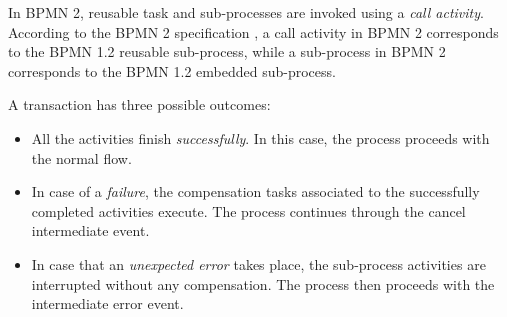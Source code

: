 In BPMN 2, reusable task and sub-processes are invoked using a \emph{call activity}. 
 According to the BPMN 2 specification \cite{BPMN20}, a call activity in BPMN 2 corresponds to the BPMN 1.2 reusable sub-process, while a sub-process in BPMN 2 corresponds to the BPMN 1.2 embedded sub-process.


A transaction has three possible outcomes:

 \begin{itemize}
\item  All the activities finish \emph{successfully}. In this case, the process proceeds with the normal flow. 
\item  In case of a \emph{failure}, the compensation tasks associated to the successfully completed activities execute. The process continues through the cancel intermediate event.
\item  In case that an \emph{unexpected error} takes place, the sub-process activities are interrupted without any compensation. The process then proceeds with the intermediate error event.
\end{itemize}


